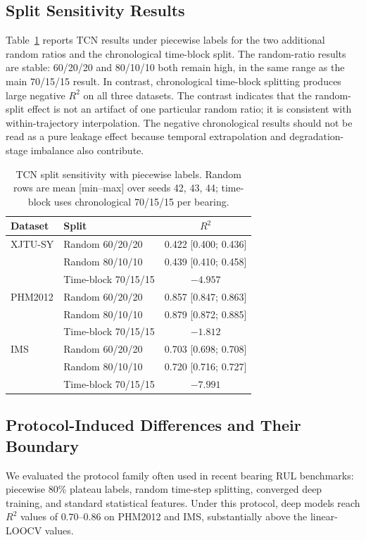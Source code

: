 \documentclass[pdflatex,sn-mathphys-num]{sn-jnl}
\begin{document}
\subsection{Split Sensitivity Results}
Table~\ref{tab:sensitivity} reports TCN results under piecewise labels for the two additional random ratios and the chronological time-block split. The random-ratio results are stable: 60/20/20 and 80/10/10 both remain high, in the same range as the main 70/15/15 result. In contrast, chronological time-block splitting produces large negative $R^2$ on all three datasets. The contrast indicates that the random-split effect is not an artifact of one particular random ratio; it is consistent with within-trajectory interpolation. The negative chronological results should not be read as a pure leakage effect because temporal extrapolation and degradation-stage imbalance also contribute.

\begin{table}[t]
\centering
\caption{TCN split sensitivity with piecewise labels. Random rows are mean [min--max] over seeds 42, 43, 44; time-block uses chronological 70/15/15 per bearing.}
\label{tab:sensitivity}
\small
\begin{tabular}{llc}
\toprule
Dataset & Split & $R^2$ \\
\midrule
XJTU-SY & Random 60/20/20 & 0.422 [0.400; 0.436] \\
 & Random 80/10/10 & 0.439 [0.410; 0.458] \\
 & Time-block 70/15/15 & $-4.957$ \\
\midrule
PHM2012 & Random 60/20/20 & 0.857 [0.847; 0.863] \\
 & Random 80/10/10 & 0.879 [0.872; 0.885] \\
 & Time-block 70/15/15 & $-1.812$ \\
\midrule
IMS & Random 60/20/20 & 0.703 [0.698; 0.708] \\
 & Random 80/10/10 & 0.720 [0.716; 0.727] \\
 & Time-block 70/15/15 & $-7.991$ \\
\bottomrule
\end{tabular}
\end{table}

\subsection{Protocol-Induced Differences and Their Boundary}
We evaluated the protocol family often used in recent bearing RUL benchmarks: piecewise 80\% plateau labels, random time-step splitting, converged deep training, and standard statistical features. Under this protocol, deep models reach $R^2$ values of $0.70$--$0.86$ on PHM2012 and IMS, substantially above the linear-LOOCV values.
\end{document}
